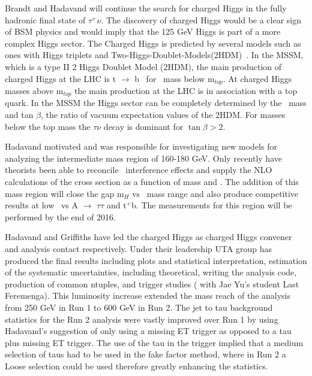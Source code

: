 \label{charged-Higgs}
Brandt and Hadavand will continue the search for charged Higgs in the fully hadronic final state of $\tau^+ \nu$.  The discovery of charged Higgs  would be a clear sign of BSM physics 
and would imply that the 125 GeV Higgs is part of a more complex Higgs sector. 
The Charged Higgs is predicted by several models such as ones with Higgs triplets and Two-Higgs-Doublet-Models(2HDM)~\cite{2hdm1,2hdm2,2hdm3}. 
In the MSSM, which is a type II 2 Higgs Doublet Model (2HDM), the main production of charged Higgs at the LHC is t $\rightarrow$ b \Hp\ for \Hp\ mass below m$_{top}$. At charged Higgs masses above m$_{top}$
the main production at the LHC is in association with a top quark.  In the MSSM the Higgs sector can be completely determined by the \Hp\ mass and tan $\beta$, the ratio of vacuum expectation values of the 2HDM.
For masses below the top mass the $\tau \nu$ decay is dominant for $\tan \beta >2 $. 


Hadavand motivated and was responsible for investigating new models for analyzing the intermediate mass region of 160-180 GeV.
Only recently have theorists been able to reconcile \ttbar\ interference effects and supply the NLO calculations of the cross section as a function of mass and \tanb.
The addition of this mass region will close the gap m$_{H}$ vs \tanb\ mass range and also produce competitive results at low \tanb\ vs A $\rightarrow$ $\tau \tau$ and \Hp \too t$^+$b.  
The measurements for this region will be performed by the end of 2016.

Hadavand and Griffiths have led the charged Higgs as charged Higgs convener and analysis contact respectively.  Under their leadership UTA group has produced the final results including plots and statistical
interpretation, estimation of the systematic uncertainties, including theoretical, writing the analysis code, production of common ntuples, and trigger studies ( with Jae Yu's student Last Feremenga).  
This luminosity increase extended the mass reach of the analysis from 250 GeV in Run 1 to 600 GeV in Run 2.
The jet to tau background statistics for the Run 2 analysis were vastly improved over Run 1 by using Hadavand's suggestion of only using a missing ET trigger as opposed to a tau plus missing ET trigger.  The use of the tau in the trigger implied that a medium selection of taus had to be used in the fake factor method, 
where in Run 2 a Loose selection could be used therefore greatly enhancing the statistics.

